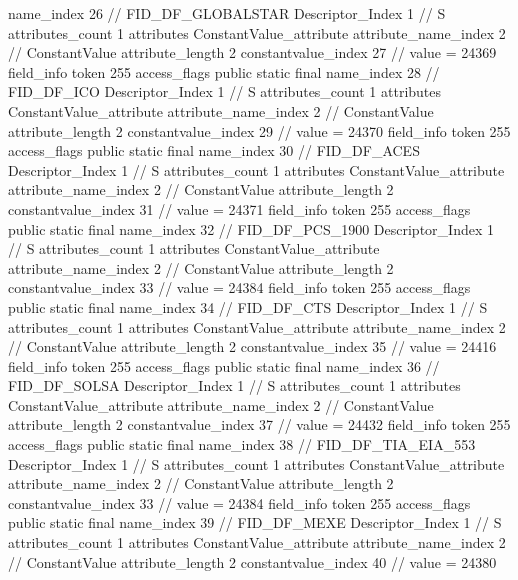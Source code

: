 {{{{{				name_index	26		// FID_DF_GLOBALSTAR
				Descriptor_Index	1		// S
				attributes_count	1
				attributes {
				ConstantValue_attribute {
					attribute_name_index	2		// ConstantValue
					attribute_length	2
					constantvalue_index	27		// value = 24369
				}
				}
			}
			field_info {
				token	255
				access_flags	public static final
				name_index	28		// FID_DF_ICO
				Descriptor_Index	1		// S
				attributes_count	1
				attributes {
				ConstantValue_attribute {
					attribute_name_index	2		// ConstantValue
					attribute_length	2
					constantvalue_index	29		// value = 24370
				}
				}
			}
			field_info {
				token	255
				access_flags	public static final
				name_index	30		// FID_DF_ACES
				Descriptor_Index	1		// S
				attributes_count	1
				attributes {
				ConstantValue_attribute {
					attribute_name_index	2		// ConstantValue
					attribute_length	2
					constantvalue_index	31		// value = 24371
				}
				}
			}
			field_info {
				token	255
				access_flags	public static final
				name_index	32		// FID_DF_PCS_1900
				Descriptor_Index	1		// S
				attributes_count	1
				attributes {
				ConstantValue_attribute {
					attribute_name_index	2		// ConstantValue
					attribute_length	2
					constantvalue_index	33		// value = 24384
				}
				}
			}
			field_info {
				token	255
				access_flags	public static final
				name_index	34		// FID_DF_CTS
				Descriptor_Index	1		// S
				attributes_count	1
				attributes {
				ConstantValue_attribute {
					attribute_name_index	2		// ConstantValue
					attribute_length	2
					constantvalue_index	35		// value = 24416
				}
				}
			}
			field_info {
				token	255
				access_flags	public static final
				name_index	36		// FID_DF_SOLSA
				Descriptor_Index	1		// S
				attributes_count	1
				attributes {
				ConstantValue_attribute {
					attribute_name_index	2		// ConstantValue
					attribute_length	2
					constantvalue_index	37		// value = 24432
				}
				}
			}
			field_info {
				token	255
				access_flags	public static final
				name_index	38		// FID_DF_TIA_EIA_553
				Descriptor_Index	1		// S
				attributes_count	1
				attributes {
				ConstantValue_attribute {
					attribute_name_index	2		// ConstantValue
					attribute_length	2
					constantvalue_index	33		// value = 24384
				}
				}
			}
			field_info {
				token	255
				access_flags	public static final
				name_index	39		// FID_DF_MEXE
				Descriptor_Index	1		// S
				attributes_count	1
				attributes {
				ConstantValue_attribute {
					attribute_name_index	2		// ConstantValue
					attribute_length	2
					constantvalue_index	40		// value = 24380
				}
}}}}}}
